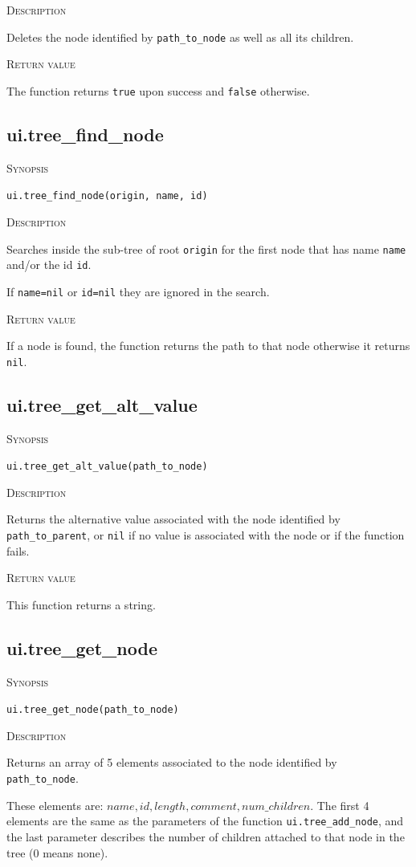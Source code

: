 \documentclass[11pt]{report}
\newcommand{\mansection}[1]{\vspace{0.5em}\par\noindent\textsc{#1}\vspace{0.5em}\par}
\newcommand{\syn}[1]{\texttt{#1}}
\begin{document}
\mansection{Description}
  Deletes the node identified by \syn{path\_to\_node} as well as all its 
  children.

\mansection{Return value}
  The function returns \syn{true} upon success and \syn{false} otherwise.


\subsection{ui.tree\_find\_node}

\mansection{Synopsis}
\syn{ui.tree\_find\_node(origin, name, id)}

\mansection{Description}
  Searches inside the sub-tree of root \syn{origin} for the first node that has 
  name \syn{name} and/or the id \syn{id}.

  If \syn{name=nil} or \syn{id=nil} they are ignored in the search.

\mansection{Return value}
  If a node is found, the function returns the path to that node otherwise 
  it returns \syn{nil}.

\subsection{ui.tree\_get\_alt\_value}

\mansection{Synopsis}
\syn{ui.tree\_get\_alt\_value(path\_to\_node)}

\mansection{Description}
  Returns the alternative value associated with the node identified by \syn{path\_to\_parent}, 
  or \syn{nil} if no value is associated with the node or if the function fails.

\mansection{Return value}
  This function returns a string.
 

\subsection{ui.tree\_get\_node}

\mansection{Synopsis}
\syn{ui.tree\_get\_node(path\_to\_node)}

\mansection{Description}
  Returns an array of 5 elements associated to the node identified by 
  \syn{path\_to\_node}.
 
  These elements are: ${name, id, length, comment, num\_children}$. 
  The first 4 elements are the same as the parameters of the function 
  \syn{ui.tree\_add\_node}, and the last parameter describes the number of 
  children attached to that node in the tree (0 means none).
\end{document}
